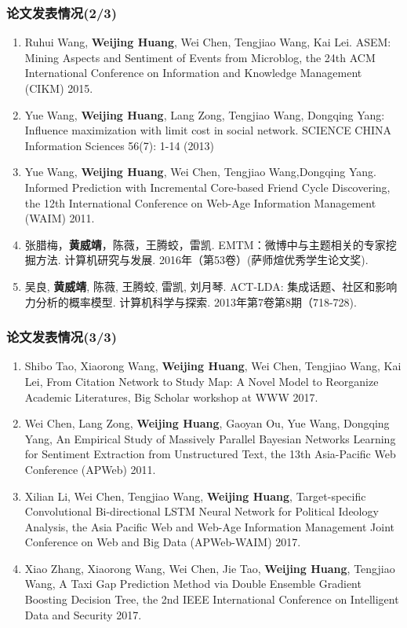 \begin{transparentFootline}
\begin{frame}
\frametitle{论文发表情况(2/3)}

\footnotesize
\begin{enumerate}\addtocounter{enumi}{5}
\item Ruhui Wang, \textbf{Weijing Huang}, Wei Chen, Tengjiao Wang, Kai Lei. ASEM: Mining Aspects and Sentiment of Events from Microblog, the 24th ACM International Conference on Information and Knowledge Management (CIKM) 2015.
\item Yue Wang, \textbf{Weijing Huang}, Lang Zong, Tengjiao Wang, Dongqing Yang: Influence maximization with limit cost in social network. SCIENCE CHINA Information Sciences 56(7): 1-14 (2013) 
\item Yue Wang, \textbf{Weijing Huang}, Wei Chen, Tengjiao Wang,Dongqing Yang. Informed Prediction with Incremental Core-based Friend Cycle Discovering, the 12th International Conference on Web-Age Information Management (WAIM) 2011. 
\item 张腊梅，\textbf{黄威靖}，陈薇，王腾蛟，雷凯. EMTM：微博中与主题相关的专家挖掘方法. 计算机研究与发展. 2016年（第53卷）(萨师煊优秀学生论文奖).
\item 吴良, \textbf{黄威靖}, 陈薇, 王腾蛟, 雷凯, 刘月琴. ACT-LDA: 集成话题、社区和影响力分析的概率模型. 计算机科学与探索. 2013年第7卷第8期（718-728). 
\end{enumerate}
\end{frame}
\end{transparentFootline}

\begin{transparentFootline}
\begin{frame}
\frametitle{论文发表情况(3/3)}

\footnotesize
\begin{enumerate}\addtocounter{enumi}{10}
\item Shibo Tao, Xiaorong Wang, \textbf{Weijing Huang}, Wei Chen, Tengjiao Wang, Kai Lei, From Citation Network to Study Map: A Novel Model to Reorganize Academic Literatures, Big Scholar workshop at WWW 2017.
\item Wei Chen, Lang Zong, \textbf{Weijing Huang}, Gaoyan Ou, Yue Wang, Dongqing Yang, An Empirical Study of Massively Parallel Bayesian Networks Learning for Sentiment Extraction from Unstructured Text, the 13th Asia-Pacific Web Conference (APWeb) 2011. 
\item Xilian Li, Wei Chen, Tengjiao Wang, \textbf{Weijing Huang}, Target-specific Convolutional Bi-directional LSTM Neural Network for Political Ideology Analysis, the Asia Pacific Web and Web-Age Information Management Joint Conference on Web and Big Data (APWeb-WAIM) 2017.
\item Xiao Zhang, Xiaorong Wang, Wei Chen, Jie Tao, \textbf{Weijing Huang}, Tengjiao Wang, A Taxi Gap Prediction Method via Double Ensemble Gradient Boosting Decision Tree, the 2nd IEEE International Conference on Intelligent Data and Security 2017.
\end{enumerate}
\end{frame}
\end{transparentFootline}

